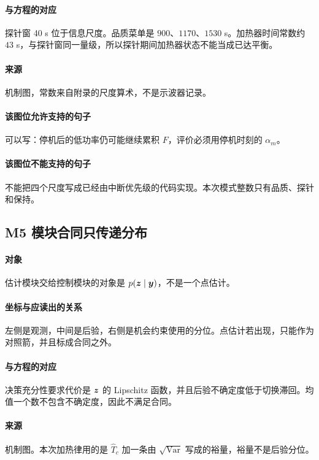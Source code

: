 \paragraph{与方程的对应}
探针窗 40 s 位于信息尺度。品质菜单是 $900$、$1170$、$1530$ s。加热器时间常数约 $43$ s，与探针窗同一量级，所以探针期间加热器状态不能当成已达平衡。

\paragraph{来源}
机制图，常数来自附录的尺度算术，不是示波器记录。

\paragraph{该图位允许支持的句子}
可以写：停机后的低功率仍可能继续累积 $F$，评价必须用停机时刻的 $\alpha_m$。

\paragraph{该图位不能支持的句子}
不能把四个尺度写成已经由中断优先级的代码实现。本次模式整数只有品质、探针和保持。

\subsection{M5 模块合同只传递分布}
\paragraph{对象}
估计模块交给控制模块的对象是 $p(\bm{z}\mid\bm{y})$，不是一个点估计。

\paragraph{坐标与应读出的关系}
左侧是观测，中间是后验，右侧是机会约束使用的分位。点估计若出现，只能作为对照箭，并且标成合同之外。

\paragraph{与方程的对应}
决策充分性要求代价是 $\bm{z}$ 的 Lipschitz 函数，并且后验不确定度低于切换滞回。均值一个数不包含不确定度，因此不满足合同。

\paragraph{来源}
机制图。本次加热律用的是 $\hat T_c$ 加一条由 $\sqrt{\mathrm{Var}}$ 写成的裕量，裕量不是后验分位。

